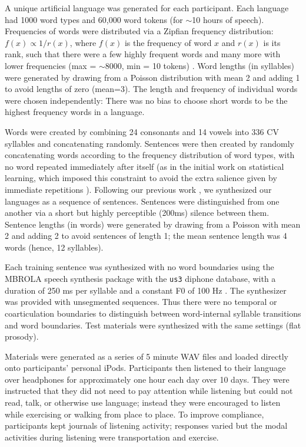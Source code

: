 \documentclass[10pt]{article}
\begin{document}
A unique artificial language was generated for each participant. Each language had 1000 word types and 60,000 word tokens (for $\sim$10 hours of speech). Frequencies of words were distributed via a Zipfian frequency distribution: $f(x) \propto 1 / r(x)$, where $f(x)$ is the frequency of word $x$ and $r(x)$ is its rank, such that there were a few highly frequent words and many more with lower frequencies (max = $\sim$8000, min = 10 tokens) \cite{zipf1965}. Word lengths (in syllables) were generated by drawing from a Poisson distribution with mean 2 and adding 1 to avoid lengths of zero (mean=3). The length and frequency of individual words were chosen independently: There was no bias to choose short words to be the highest frequency words in a language.

Words were created by combining 24 consonants and 14 vowels into 336 CV syllables and concatenating randomly. Sentences were then created by randomly concatenating words according to the frequency distribution of word types, with no word repeated immediately after itself (as in the initial work on statistical learning, which imposed this constraint to avoid the extra salience given by immediate repetitions \cite{saffran1996a,saffran1996b}). Following our previous work \cite{frank2010,kurumada2011}, we synthesized our languages as a sequence of sentences. Sentences were distinguished from one another via a short but highly perceptible (200ms) silence between them. Sentence lengths (in words) were generated by drawing from a Poisson with mean 2 and adding 2 to avoid sentences of length 1; the mean sentence length was 4 words (hence, 12 syllables). 

Each training sentence was synthesized with no word boundaries using the MBROLA speech synthesis package with the \texttt{us3} diphone database, with a duration of 250 ms per syllable and a constant F0 of 100 Hz \cite{dutoit1996}. The synthesizer was provided with unsegmented sequences. Thus there were no temporal or coarticulation boundaries to distinguish between word-internal syllable transitions and word boundaries. Test materials were synthesized with the same settings (flat prosody). 

Materials were generated as a series of 5 minute WAV files and loaded directly onto participants' personal iPods. Participants then listened to their language over headphones for approximately one hour each day over 10 days. They were instructed that they did not need to pay attention while listening but could not read, talk, or otherwise use language; instead they were encouraged to listen while exercising or walking from place to place. To improve compliance, participants kept journals of listening activity; responses varied but the modal activities during listening were transportation and exercise. 
\end{document}
